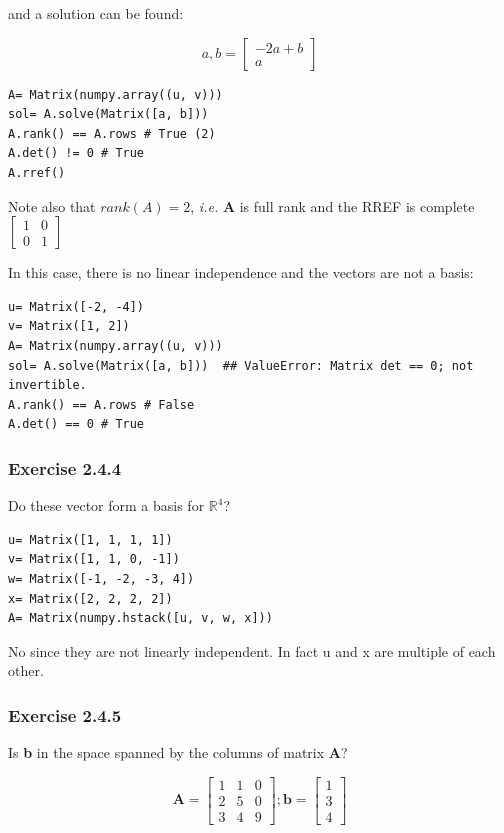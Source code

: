 and a solution can be found:

$$
a, b= \left[\begin{matrix}- 2 a + b\\a\end{matrix}\right]
$$

\begin{verbatim}
A= Matrix(numpy.array((u, v)))
sol= A.solve(Matrix([a, b]))
A.rank() == A.rows # True (2)
A.det() != 0 # True
A.rref() 
\end{verbatim}

Note also that $rank(A) = 2$, \emph{i.e.} \textbf{A} is full rank and the RREF
is complete $\left[\begin{matrix}1 & 0\\0 & 1\end{matrix}\right]$

In this case, there is no linear independence and the vectors are not a basis:

\begin{verbatim}
u= Matrix([-2, -4])
v= Matrix([1, 2])
A= Matrix(numpy.array((u, v)))
sol= A.solve(Matrix([a, b]))  ## ValueError: Matrix det == 0; not invertible.
A.rank() == A.rows # False
A.det() == 0 # True
\end{verbatim}

\subsubsection{Exercise 2.4.4}

Do these vector form a basis for $\mathbb{R}^4$?

\begin{verbatim}
u= Matrix([1, 1, 1, 1])
v= Matrix([1, 1, 0, -1])
w= Matrix([-1, -2, -3, 4])
x= Matrix([2, 2, 2, 2])
A= Matrix(numpy.hstack([u, v, w, x]))
\end{verbatim}

No since they are not linearly independent. In fact u and x are multiple of each other.

\subsubsection{Exercise 2.4.5}

Is \textbf{b} in the space spanned by the columns of matrix \textbf{A}?

\begin{equation}
\mathbf{A} = \left[\begin{matrix}1 & 1 & 0\\2 & 5 & 0\\3 & 4 & 9\end{matrix}\right];
\mathbf{b} = \left[\begin{matrix}1\\3\\4\end{matrix}\right]
\end{equation}

